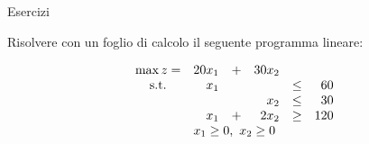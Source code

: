 \documentclass{beamer}
\begin{document}
\generatitolo
\begin{frame}%
{Esercizi}

Risolvere con un foglio di calcolo il seguente programma lineare:

\begin{enumerate}
{\footnotesize \item
$$\begin{array}{crrrcr}
\max z=& 20 x_1 &+& 30 x_2\\
{\rm s.t.} &  x_1 & &      & \leq &  60 \\
           &      & &  x_2 & \leq &  30 \\
           &  x_1 &+&2 x_2 & \geq & 120 \\
           \multicolumn{6}{c}{x_1 \geq 0,\ x_2 \geq 0}
\end{array}%
$$%
}
\end{enumerate}

\end{frame}
\end{document}
